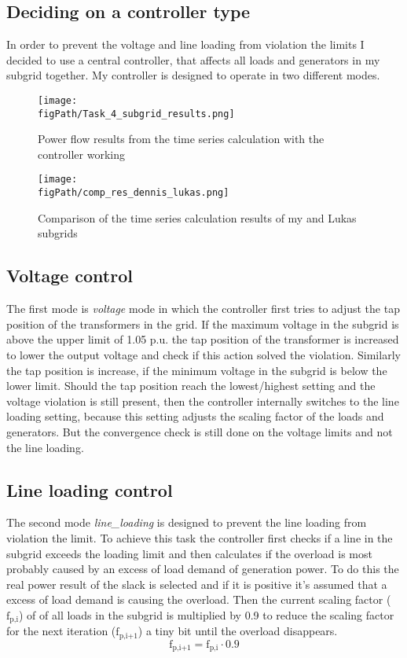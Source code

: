 \documentclass[conference]{IEEEtran}
\newcommand{\figPath}{images}
\begin{document}
\subsection{Deciding on a controller type}
In order to prevent the voltage and line loading from violation the limits I decided to use a central controller, that affects all loads and generators in my subgrid together. My controller is designed to operate in two different modes. 
\begin{figure*}[htbp]
	\centering
	\texttt{[image: \\figPath/Task\_4\_subgrid\_results.png]}
	\caption{Power flow results from the time series calculation with the controller working}
	\label{fig:pf_res_task_4}
\end{figure*}
\begin{figure*}[htbp]
	\centering
	\texttt{[image: \\figPath/comp\_res\_dennis\_lukas.png]}
	\caption{Comparison of the time series calculation results of my and Lukas subgrids}
	\label{fig:pf_res_task_5}
\end{figure*}
\subsection*{Voltage control}
The first mode is \textit{voltage} mode in which the controller first tries to adjust the tap position of the transformers in the grid. If the maximum voltage in the subgrid is above the upper limit of 1.05 p.u. the tap position of the transformer is increased to lower the output voltage and check if this action solved the violation. Similarly the tap position is increase, if the minimum voltage in the subgrid is below the lower limit. Should the tap position reach the lowest/highest setting and the voltage violation is still present, then the controller internally switches to the line loading setting, because this setting adjusts the scaling factor of the loads and generators. But the convergence check is still done on the voltage limits and not the line loading.
\subsection*{Line loading control}
The second mode \textit{line\_loading} is designed to prevent the line loading from violation the limit. To achieve this task the controller first checks if a line in the subgrid exceeds the loading limit and then calculates if the overload is most probably caused by an excess of load demand of generation power. To do this the real power result of the slack is selected and if it is positive it's assumed that a excess of load demand is causing the overload. Then the current scaling factor ($\text{f}_{\text{p,i}}$) of of all loads in the subgrid is multiplied by 0.9 to reduce the scaling factor for the next iteration ($\text{f}_{\text{p,i+1}}$) a tiny bit until the overload disappears.
\begin{equation}
	\text{f}_{\text{p,i+1}} = \text{f}_{\text{p,i}} \cdot 0.9
\end{equation}
\end{document}

